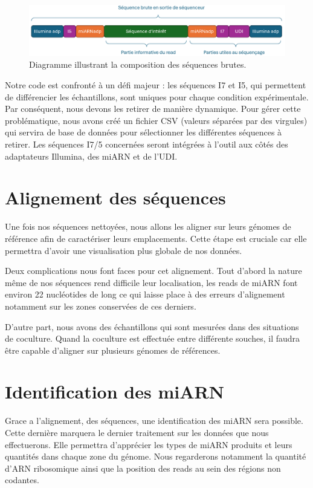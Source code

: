 \begin{figure}[ht]
    \centering
    \includegraphics[width=1\textwidth]{img/sequence.PNG}
    \caption{Diagramme illustrant la composition des séquences brutes.}
    \label{fig:sequence}
\end{figure}

Notre code est confronté à un défi majeur : les séquences I7 et I5, qui permettent de différencier les échantillons, sont uniques pour chaque condition expérimentale. Par conséquent, nous devons les retirer de manière dynamique. Pour gérer cette problématique, nous avons créé un fichier CSV (valeurs séparées par des virgules) qui servira de base de données pour sélectionner les différentes séquences à retirer. Les séquences I7/5 concernées seront intégrées à l'outil aux côtés des adaptateurs Illumina, des miARN et de l'UDI.\\

\section{Alignement des séquences}
Une fois nos séquences nettoyées, nous allons les aligner sur leurs génomes de référence afin de caractériser leurs emplacements. Cette étape est cruciale car elle permettra d’avoir une visualisation plus globale de nos données. 

Deux complications nous font faces pour cet alignement. Tout d’abord la nature même de nos séquences rend difficile leur localisation, les reads de miARN font environ 22 nucléotides de long ce qui laisse place à des erreurs d’alignement notamment sur les zones conservées de ces derniers.

D’autre part, nous avons des échantillons qui sont mesurées dans des situations de coculture. Quand la coculture est effectuée entre différente souches, il faudra être capable d’aligner sur plusieurs génomes de références. 

\section{Identification des miARN}
Grace a l’alignement, des séquences, une identification des miARN sera possible. Cette dernière marquera le dernier traitement sur les données que nous effectuerons. Elle permettra d’apprécier les types de miARN produits et leurs quantités dans chaque zone du génome. Nous regarderons notamment la quantité d’ARN ribosomique ainsi que la position des reads au sein des régions non codantes. 

